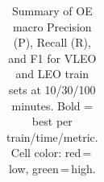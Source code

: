 \begin{table}[t]
{\begin{tabular}{l ccc ccc ccc ccc ccc ccc}
\bottomrule
\end{tabular}%
}
\caption{Summary of OE macro Precision (P), Recall (R), and F1 for VLEO and LEO train sets at 10/30/100 minutes. Bold = best per train/time/metric. Cell color: red\,=\,low, green\,=\,high.}
\label{tab:class_vleo_leo_oe}
\end{table}
